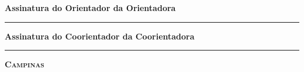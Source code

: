 \noindent
{\small\textbf{Assinatura
\ifx\femaleOrientador\undefined
do Orientador
\else
da Orientadora
\fi
}

\vspace{.5cm}
\noindent
\rule[1pt]{7cm}{.5pt}  %
}
\vspace{.5cm}

\ifx\coorientador\undefined
\else
\noindent
{\small\textbf{Assinatura
\ifx\femaleCoorientador\undefined
do Coorientador
\else
da Coorientadora
\fi
}

\vspace{.5cm}
\noindent
\rule[1pt]{7cm}{.5pt}  %
}
\fi
\vfill
\begin{center}
  {\small\textbf{\textsc{ Campinas \\ \ano}}}
\end{center}
